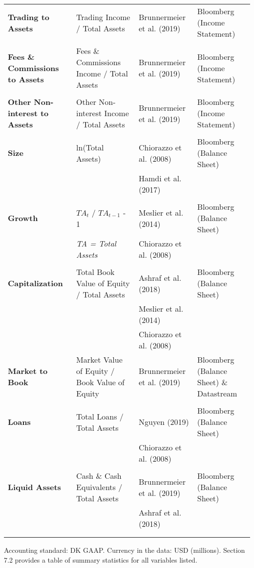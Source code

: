\documentclass[10pt]{article} %
\begin{document}
\begin{table}[H]
{\begin{tabular}{llll}
\textbf{Trading to Assets} & Trading Income / Total Assets  & Brunnermeier et al. (2019) & Bloomberg (Income Statement) \\\\

\textbf{Fees \& Commissions to Assets} & Fees \& Commissions Income / Total Assets  & Brunnermeier et al. (2019) & Bloomberg (Income Statement) \\\\

\textbf{Other Non-interest to Assets} & Other Non-interest Income / Total Assets  & Brunnermeier et al. (2019) & Bloomberg (Income Statement) \\\\

\textbf{Size} & ln(Total Assets) &  Chiorazzo et al. (2008) & Bloomberg (Balance Sheet) \\
& & Hamdi et al. (2017) & & \\\\

\textbf{Growth} & $TA_{t}$ / $TA_{t-1}$ - 1 &  Meslier et al. (2014) & Bloomberg (Balance Sheet) \\
& \textit{TA = Total Assets} & Chiorazzo et al. (2008) & \\\\

\textbf{Capitalization} & Total Book Value of Equity / Total Assets & Ashraf et al. (2018) & Bloomberg (Balance Sheet) \\
& & Meslier et al. (2014) & \\
& & Chiorazzo et al. (2008) & & \\


\textbf{Market to Book} & Market Value of Equity /  Book Value of Equity & Brunnermeier et al. (2019) & Bloomberg (Balance Sheet) \& Datastream \\\\

\textbf{Loans} & Total Loans / Total Assets & Nguyen (2019) & Bloomberg (Balance Sheet) \\
& & Chiorazzo et al. (2008) & \\\\

\textbf{Liquid Assets} & Cash \& Cash Equivalents / Total Assets & Brunnermeier et al. (2019) & Bloomberg (Balance Sheet)
\\ 
& & Ashraf et al. (2018) \\\\
\hline \hline \\
\end{tabular}}
\end{table}
\scriptsize{Accounting standard: DK GAAP. Currency in the data: USD (millions). Section 7.2 provides a table of summary statistics for all variables listed.}
\newpage
\end{document}
